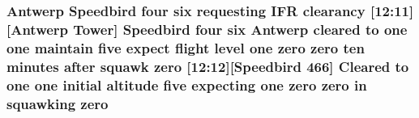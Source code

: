 \subsubsection[{\texorpdfstring{zero}{zero}}]{\setlength{\rightskip}{0pt plus 5cm}Antwerp Speedbird four {\bf six} requesting I\+FR clearancy \mbox{[}12\+:11\mbox{]}\mbox{[}Antwerp {\bf Tower}\mbox{]} Speedbird four {\bf six} Antwerp cleared to {\bf one} {\bf one} maintain five expect flight level {\bf one} zero zero {\bf ten} minutes after squawk zero \mbox{[}12\+:12\mbox{]}\mbox{[}Speedbird 466\mbox{]} Cleared to {\bf one} {\bf one} initial altitude five expecting {\bf one} zero zero in {\bf squawking} zero}\hypertarget{happyDay5ATC_8txt_a1cdb3e947394a8f9b50cff125d86fb29}{}\label{happyDay5ATC_8txt_a1cdb3e947394a8f9b50cff125d86fb29}
